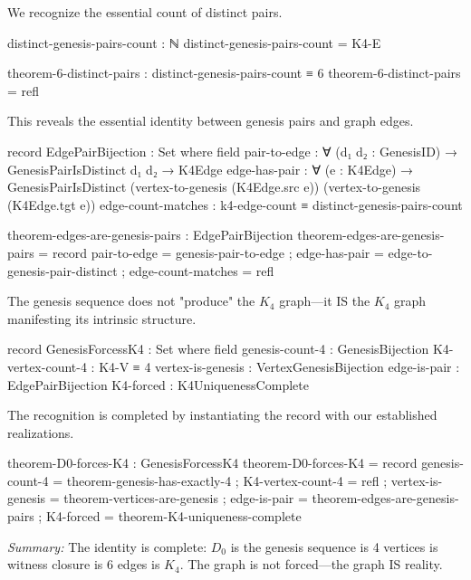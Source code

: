 \documentclass[11pt,a4paper]{book}
\begin{document}
We recognize the essential count of distinct pairs.

\begin{code}
distinct-genesis-pairs-count : ℕ
distinct-genesis-pairs-count = K4-E

theorem-6-distinct-pairs : distinct-genesis-pairs-count ≡ 6
theorem-6-distinct-pairs = refl

\end{code}

This reveals the essential identity between genesis pairs and graph edges.

\begin{code}
record EdgePairBijection : Set where
  field
    pair-to-edge : ∀ (d₁ d₂ : GenesisID) → GenesisPairIsDistinct d₁ d₂ → K4Edge
    edge-has-pair : ∀ (e : K4Edge) → 
      GenesisPairIsDistinct (vertex-to-genesis (K4Edge.src e)) (vertex-to-genesis (K4Edge.tgt e))
    edge-count-matches : k4-edge-count ≡ distinct-genesis-pairs-count

theorem-edges-are-genesis-pairs : EdgePairBijection
theorem-edges-are-genesis-pairs = record
  { pair-to-edge = genesis-pair-to-edge
  ; edge-has-pair = edge-to-genesis-pair-distinct
  ; edge-count-matches = refl
  }

\end{code}

The genesis sequence does not "produce" the $K_4$ graph—it IS the $K_4$ graph manifesting its intrinsic structure.

\begin{code}
record GenesisForcessK4 : Set where
  field
    genesis-count-4 : GenesisBijection
    K4-vertex-count-4 : K4-V ≡ 4
    vertex-is-genesis : VertexGenesisBijection
    edge-is-pair : EdgePairBijection
    K4-forced : K4UniquenessComplete

\end{code}

The recognition is completed by instantiating the record with our established realizations.

\begin{code}
theorem-D0-forces-K4 : GenesisForcessK4
theorem-D0-forces-K4 = record
  { genesis-count-4 = theorem-genesis-has-exactly-4
  ; K4-vertex-count-4 = refl
  ; vertex-is-genesis = theorem-vertices-are-genesis
  ; edge-is-pair = theorem-edges-are-genesis-pairs
  ; K4-forced = theorem-K4-uniqueness-complete
  }
\end{code}

\medskip
\noindent\textit{Summary:} The identity is complete: $D_0$ is the genesis sequence is 4 vertices 
is witness closure is 6 edges is $K_4$. The graph is not forced—the graph IS reality.
\end{document}
